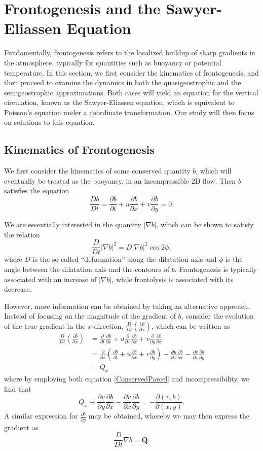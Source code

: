 \documentclass[11pt,onecolumn,oneside]{article}
\newcommand{\pdiff}[2]{\frac{\partial #1}{\partial #2}}
\begin{document}
\section{Frontogenesis and the Sawyer-Eliassen Equation}

Fundamentally, frontogenesis refers to the localized buildup of sharp gradients in the atmosphere, typically for quantities such as buoyancy or potential temperature. In this section, we first consider the kinematics of frontogenesis, and then proceed to examine the dynamics in both the quasigeostrophic and the semigeostrophic approximations. Both cases will yield an equation for the vertical circulation, known as the Sawyer-Eliassen equation, which is equivalent to Poisson's equation under a coordinate transformation. Our study will then focus on solutions to this equation.


\subsection{Kinematics of Frontogenesis}

We first consider the kinematics of some conserved quantity $b$, which will eventually be treated as the buoyancy, in an incompressible 2D flow. Then $b$ satisfies the equation
\begin{equation}\label{ConservedParcel}
\frac{Db}{Dt} = \pdiff{b}{t} + u \pdiff{b}{x} + v \pdiff{b}{y} = 0.
\end{equation}

We are essentially interested in the quantity $|\nabla b|$, which can be shown to satisfy the relation
\[
\frac{D}{Dt} |\nabla b|^2 = D |\nabla b|^2 \cos 2\phi,
\]
where $D$ is the so-called ``deformation'' along the dilatation axis and $\phi$ is the angle between the dilatation axis and the contours of $b$. Frontogenesis is typically associated with an increase of $|\nabla b|$, while frontolysis is associated with its decrease.

However, more information can be obtained by taking an alternative approach. Instead of focusing on the magnitude of the gradient of $b$, consider the evolution of the true gradient in the $x$-direction, $\frac{D}{Dt} \left( \pdiff{b}{x} \right)$, which can be written as
\[ \begin{split}
\frac{D}{Dt}\left(\pdiff{b}{x}\right) &= \pdiff{}{t} \pdiff{b}{x} + u \pdiff{}{x} \pdiff{b}{x} + v \pdiff{}{y} \pdiff{b}{x} \\
 &= \pdiff{}{x} \left(\pdiff{b}{t} + u \pdiff{b}{x} + v \pdiff{b}{y} \right) - \pdiff{u}{x} \pdiff{b}{x} - \pdiff{v}{x} \pdiff{b}{y} \\
 &= Q_x
\end{split} \]
where by employing both equation \eqref{ConservedParcel} and incompressibility, we find that
\[
Q_x \equiv \pdiff{v}{y} \pdiff{b}{x} - \pdiff{v}{x} \pdiff{b}{y} = -\frac{\partial(v,b)}{\partial(x,y)}.
\]
A similar expression for $\pdiff{b}{y}$ may be obtained, whereby we may then express the gradient as
\begin{equation}\label{KinematicEqn}
\frac{D}{Dt} \nabla b = \mathbf{Q}.
\end{equation}
\end{document}
